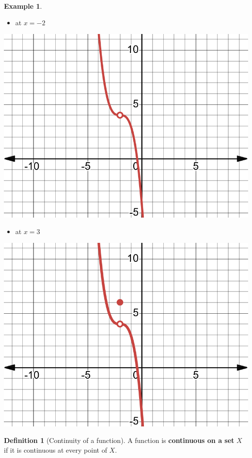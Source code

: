 \documentclass[
]{book}
\providecommand{\tightlist}{%
  \setlength{\itemsep}{0pt}\setlength{\parskip}{0pt}}
\theoremstyle{definition}
\newtheorem{definition}{Definition}[chapter]
\theoremstyle{definition}
\newtheorem{example}{Example}[chapter]
\theoremstyle{definition}
\theoremstyle{definition}
\theoremstyle{remark}
\begin{document}
\begin{example}
\begin{itemize}
\tightlist
\item
  at \(x = -2\)
\end{itemize}

\includegraphics{fig/fig9.png}

\begin{itemize}
\tightlist
\item
  at \(x = 3\)
\end{itemize}

\includegraphics{fig/fig10.png}
\end{example}

\begin{definition}[Continuity of a function]
\protect\hypertarget{def:unnamed-chunk-20}{}\label{def:unnamed-chunk-20}A function is
\textbf{continuous on a set} \(X\) if it is continuous at every point of \(X\).
\end{definition}
\end{document}
